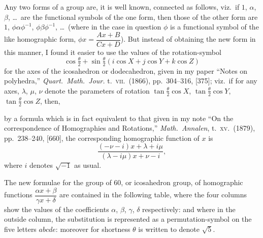 \documentclass[11pt,a4paper]{article}
\begin{document}
Any two forms of a group are, it is well known, connected as follows, viz.\
if $1$, $\alpha$, $\beta$, \dots\ are the functional symbols of the one form,
then those of the other form are $1$, $\phi\alpha\phi^{-1}$,
$\phi\beta\phi^{-1}$, \dots\ (where in the case in question $\phi$ is a
functional symbol of the like homographic form,
$\phi x = \dfrac{Ax + B}{Cx + D}$).  But instead of obtaining the new form in
this manner, I found it easier to use the values of the rotation-symbol
\[
  \cos\tfrac{\theta}{2} + \sin\tfrac{\theta}{2}
   (i \cos X + j \cos Y + k \cos Z)
\]
for the axes of the icosahedron or dodecahedron, given in my paper
``Notes on polyhedra,'' \emph{Quart.\ Math.\ Jour.} t.\ \textsc{vii}.\ (1866),
pp.\ 304--316, [375]; viz.\ if for any axes, $\lambda$, $\mu$, $\nu$ denote
the parameters of rotation $\tan\tfrac{\theta}{2}\cos X$,
$\tan\tfrac{\theta}{2}\cos Y$, $\tan\tfrac{\theta}{2}\cos Z$, then,

by a formula which is in fact equivalent to that given in my note ``On the
correspondence of Homographies and Rotations,'' \emph{Math.\ Annalen},
t.\ \textsc{xv}.\ (1879), pp.\ 238--240, [660], the corresponding homographic
function of $x$ is
\[
  \frac{(-\nu - i)x + \lambda + i\mu}{(\lambda - i\mu)x + \nu - i},
\]
where $i$ denotes $\sqrt{-1}$ as usual.

The new formulae for the group of $60$, or icosahedron group, of homographic
functions $\dfrac{\alpha x + \beta}{\gamma x + \delta}$ are contained in the
following table, where the four columns show the values of the coefficients
$\alpha$, $\beta$, $\gamma$, $\delta$ respectively: and where in the outside
column, the substitution is represented as a permutation-symbol on the five
letters $abcde$: moreover for shortness $\theta$ is written to denote
$\sqrt{5}$.
\end{document}

